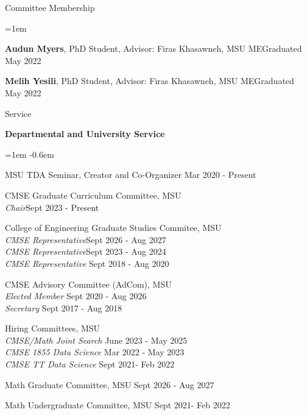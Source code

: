 \documentclass{resume} %
\begin{document}
\begin{rSection}{Committee Membership}
\begin{list}{}{\leftmargin=1em}
   \item \textbf{Audun Myers}, PhD Student, Advisor: Firas Khasawneh, MSU ME\hfill Graduated May 2022
   \item \textbf{Melih Yesili}, PhD Student, Advisor: Firas Khasawneh, MSU ME\hfill Graduated May 2022
\end{list}


\end{rSection}


%
\newpage
\begin{rSection}{Service}



\textbf{Departmental and University Service}
\begin{list}{}{\leftmargin=1em}
   \itemsep -0.6em \vspace{-0.5em} %

\item
MSU TDA Seminar, Creator and Co-Organizer  \hfill Mar 2020 - Present

\item CMSE Graduate Curriculum Committee, MSU\\ 
\phantom{xxx} \textit{Chair}\hfill Sept 2023 - Present 
\item
College of Engineering Graduate Studies Commitee, MSU \\
   \phantom{xxx} \textit{CMSE Representative}\hfill Sept 2026 - Aug 2027\\ 
   \phantom{xxx} \textit{CMSE Representative}\hfill Sept 2023 - Aug 2024\\ 
   \phantom{xxx} \textit{CMSE Representative} \hfill Sept 2018 - Aug 2020

\item
CMSE Advisory Committee (AdCom), MSU\\
\phantom{xxx} \textit{Elected Member} \hfill Sept 2020 - Aug 2026\\
\phantom{xxx} \textit{Secretary} \hfill  Sept 2017 - Aug 2018
\item Hiring Committees, MSU \\
\phantom{xxx} \textit{CMSE/Math Joint Search} \hfill June 2023 - May 2025\\
\phantom{xxx} \textit{CMSE 1855 Data Science } \hfill Mar 2022 - May 2023\\
\phantom{xxx} \textit{CMSE TT Data Science} \hfill  Sept 2021- Feb 2022
\item Math Graduate Committee, MSU \hfill Sept 2026 - Aug 2027
\item Math Undergraduate Committee, MSU  \hfill  Sept 2021- Feb 2022


\end{list}
\end{rSection}
\end{document}
